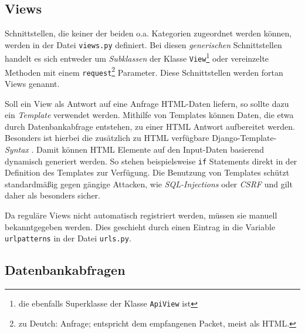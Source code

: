 \hypertarget{views}{%
\subsection{Views}\label{views}}

Schnittstellen, die keiner der beiden o.a. Kategorien zugeordnet werden
können, werden in der Datei \texttt{views.py} definiert. Bei diesen
\emph{generischen}
Schnittstellen handelt es sich entweder um
\emph{Subklassen}
der Klasse \texttt{View}\footnote{die ebenfalls Superklasse der Klasse
  \texttt{ApiView} ist} \cite{django-doku-class-based-views} oder
vereinzelte Methoden mit einem \texttt{request}\footnote{zu Deutch:
  Anfrage; entspricht dem empfangenen Packet, meist als HTML.}
Parameter. \cite{django-doku-views} Diese Schnittstellen werden fortan
Views genannt.

Soll ein View als Antwort auf eine Anfrage HTML-Daten liefern, so sollte
dazu ein \emph{Template}
verwendet werden. Mithilfe von Templates können Daten, die etwa durch
Datenbankabfrage entstehen, zu einer HTML Antwort aufbereitet werden.
Besonders ist hierbei die zusätzlich zu HTML verfügbare
Django-Template-\emph{Syntax}
\cite{django-doku-template}. Damit können HTML Elemente auf den
Input-Daten basierend dynamisch generiert werden. So stehen
beispielsweise \texttt{if} Statements direkt in der Definition des
Templates zur Verfügung. Die Benutzung von Templates schützt
standardmäßig gegen gängige Attacken, wie
\emph{SQL-Injections}
oder \emph{CSRF}
\cite{csrf}
und gilt daher als besonders sicher.

Da reguläre Views nicht automatisch registriert werden, müssen sie
manuell bekanntgegeben werden. Dies geschieht durch einen Eintrag in die
Variable \texttt{urlpatterns} in der Datei \texttt{urls.py}.
\cite{django-doku-urls}

\hypertarget{datenbankabfragen}{%
\subsection{Datenbankabfragen}\label{datenbankabfragen}}

